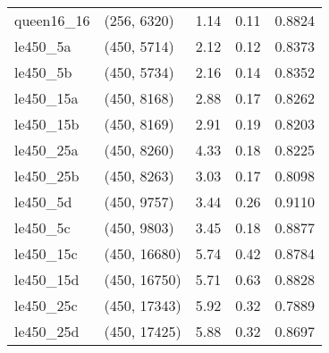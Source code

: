 \begin{tabular}{llrrr}
queen16\_16 &  (256, 6320) &      1.14 &     0.11 & 0.8824 \\
  le450\_5a &  (450, 5714) &      2.12 &     0.12 & 0.8373 \\
  le450\_5b &  (450, 5734) &      2.16 &     0.14 & 0.8352 \\
 le450\_15a &  (450, 8168) &      2.88 &     0.17 & 0.8262 \\
 le450\_15b &  (450, 8169) &      2.91 &     0.19 & 0.8203 \\
 le450\_25a &  (450, 8260) &      4.33 &     0.18 & 0.8225 \\
 le450\_25b &  (450, 8263) &      3.03 &     0.17 & 0.8098 \\
  le450\_5d &  (450, 9757) &      3.44 &     0.26 & 0.9110 \\
  le450\_5c &  (450, 9803) &      3.45 &     0.18 & 0.8877 \\
 le450\_15c & (450, 16680) &      5.74 &     0.42 & 0.8784 \\
 le450\_15d & (450, 16750) &      5.71 &     0.63 & 0.8828 \\
 le450\_25c & (450, 17343) &      5.92 &     0.32 & 0.7889 \\
 le450\_25d & (450, 17425) &      5.88 &     0.32 & 0.8697 \\
\bottomrule
\end{tabular}
